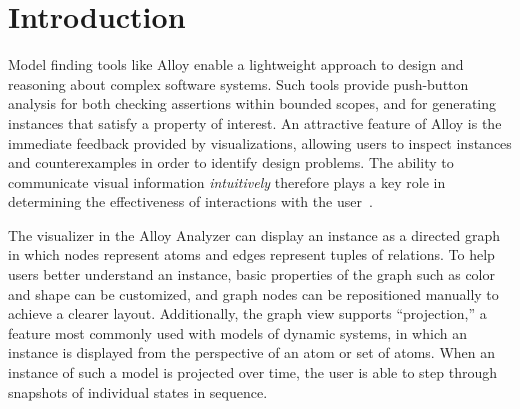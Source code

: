 \documentclass[runningheads]{llncs}
\begin{document}


\section{Introduction}
\label{introduction}

Model finding tools like Alloy enable a lightweight approach to design and reasoning about complex software systems. Such tools provide push-button analysis for both checking assertions within bounded scopes, and for generating instances that satisfy a property of interest. An attractive feature of Alloy is the immediate feedback provided by visualizations, allowing users to inspect instances and counterexamples in order to identify design problems. The ability to communicate visual information \emph{intuitively} therefore plays a key role in determining the effectiveness of interactions with the user~\cite{gammaitoni2014}.

The visualizer in the Alloy Analyzer can display an instance as a directed graph in which nodes represent atoms and edges represent tuples of relations.
To help users better understand an instance, basic properties of the graph such as color and shape can be customized, and graph nodes can be repositioned manually to achieve a clearer layout.
Additionally, the graph view supports ``projection,'' a feature most commonly used with models of dynamic systems, in which an instance is displayed from the perspective of an atom or set of atoms.
When an instance of such a model is projected over time, the user is able to step through snapshots of individual states in sequence.
\end{document}
